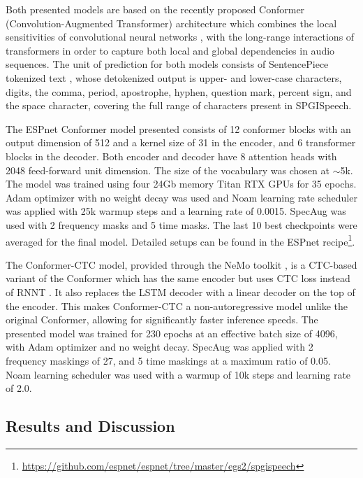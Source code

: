 \documentclass{article}
\newcommand{\corpus}{SPGISpeech}
\begin{document}
Both presented models are based on the recently proposed Conformer (Convolution-Augmented Transformer) architecture \cite{gulati2020conformer} which combines the local sensitivities of convolutional neural networks \cite{fukushima80, abdelhamid14}, with the long-range interactions of transformers \cite{vaswani17} in order to capture both local and global dependencies in audio sequences. The unit of prediction for both models consists of SentencePiece tokenized text \cite{richardson18}, whose detokenized output is upper- and lower-case characters, digits, the comma, period, apostrophe, hyphen, question mark, percent sign, and the space character, covering the full range of characters present in \corpus{}.

The ESPnet Conformer model presented consists of 12 conformer blocks with an output dimension of 512 and a kernel size of 31 in the encoder, and 6 transformer blocks in the decoder.
Both encoder and decoder have 8 attention heads with 2048 feed-forward unit dimension. The size of the vocabulary was chosen at $\sim$5k. The model was trained using four 24Gb memory Titan RTX GPUs for 35 epochs. Adam optimizer with no weight decay was used and Noam learning rate scheduler was applied with 25k warmup steps and a learning rate of 0.0015. SpecAug was used with 2 frequency masks and 5 time masks. The last 10 best checkpoints were averaged for the final model. Detailed setups can be found in the ESPnet recipe\footnote{\url{https://github.com/espnet/espnet/tree/master/egs2/spgispeech}\label{foot:espnet}}.

The Conformer-CTC model, provided through the NeMo toolkit \cite{kuchaiev19}, is a CTC-based variant of the Conformer which has the same encoder but uses CTC loss \cite{graves06} instead of RNNT \cite{graves12}. It also replaces the LSTM decoder with a linear decoder on the top of the encoder. This makes
Conformer-CTC a non-autoregressive model unlike the original
Conformer, allowing for significantly faster inference speeds. The presented model was trained for 230 epochs at an effective batch size of 4096, with Adam optimizer and no weight decay. SpecAug was applied with 2 frequency maskings of 27, and 5 time maskings at a maximum ratio of 0.05. Noam learning scheduler was used with a warmup of 10k steps and learning rate of 2.0.

\subsection{Results and Discussion}
\end{document}
